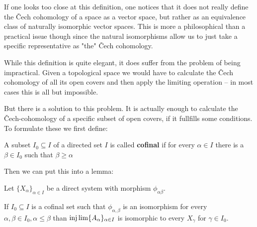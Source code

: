 \begin{remark}
If one looks too close at this definition, one notices that it does not really define the
Čech cohomology of a space as a vector space, but rather as an equivalence class
of naturally isomorphic vector spaces. This is more a philosophical than a practical issue though
since the natural isomorphisms allow us to just take a specific representative as "the" Čech cohomology.
\end{remark}

While this definition is quite elegant, it does suffer from the problem of being impractical.
Given a topological space we would have to calculate the Čech cohomology of all its open covers and
then apply the limiting operation – in most cases this is all but impossible.

But there is a solution to this problem. It is actually enough to calculate the Čech-cohomology of
a specific subset of open covers, if it fullfills some conditions. To formulate these we first define:
\begin{definition}
A subset $I_0 \subseteq I$ of a directed set $I$ is called \textbf{cofinal} if for every $\alpha \in I$
there is a $\beta \in I_0$ such that $\beta \geqslant \alpha$
\end{definition}

Then we can put this into a lemma:
\begin{lemma}
	Let $\{X_\alpha\}_{\alpha \in I}$ be a direct system with morphism $\phi_{\alpha \beta}$.

	If $I_0 \subseteq I$ is a cofinal set such that $\phi_{\alpha, \beta}$ is an isomorphism for every
	$\alpha, \beta \in I_0, \alpha \leqslant \beta$ than $\injlim \{A_\alpha\}_{\alpha \in I}$ is isomorphic
	to every $X_\gamma$ for $\gamma \in I_0$.
\end{lemma}

